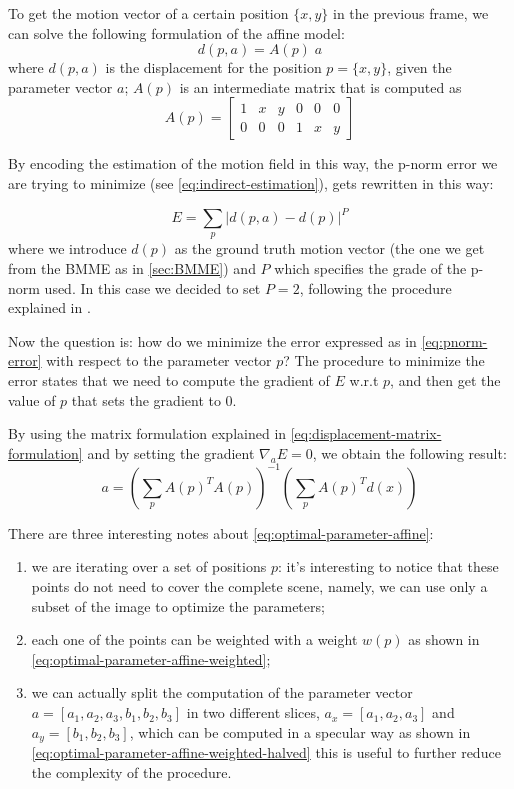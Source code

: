 To get the motion vector of a certain position $\{x,y\}$ in the previous frame, we can solve the following formulation of the affine model:
\begin{equation}
    \label{eq:displacement-matrix-formulation}
    d(p, a) = A(p)\;a
\end{equation}
where $d(p, a)$ is the displacement for the position $p = \{x,y\}$, given the parameter vector $a$; $A(p)$ is an intermediate matrix that is computed as 
\begin{equation*}
    A(p) = \begin{bmatrix}
        1 & x & y & 0 & 0 & 0 \\
        0 & 0 & 0 & 1 & x & y
    \end{bmatrix}
\end{equation*}

By encoding the estimation of the motion field in this way, the p-norm error we are trying to minimize (see \cref{eq:indirect-estimation}), gets rewritten in this way:

\begin{equation}
    \label{eq:pnorm-error}
    E = \sum_p{\left| d(p, a) - d(p) \right|^P}
\end{equation}
where we introduce $d(p)$ as the ground truth motion vector (the one we get from the BMME as in \cref{sec:BMME}) and $P$ which specifies the grade of the p-norm used. In this case we decided to set $P=2$, following the procedure explained in \cite{WangBook}.

Now the question is: how do we minimize the error expressed as in \cref{eq:pnorm-error} with respect to the parameter vector $p$?
The procedure to minimize the error states that we need to compute the gradient of $E$ w.r.t $p$, and then get the value of $p$ that sets the gradient to 0.

By using the matrix formulation explained in \cref{eq:displacement-matrix-formulation} and by setting the gradient $\nabla_a E = 0$, we obtain the following result:
\begin{equation}
    \label{eq:optimal-parameter-affine}
    a = \left (\sum_p A(p)^T A(p) \right )^{-1} \left (\sum_p A(p)^T d(x) \right)
\end{equation}

There are three interesting notes about \cref{eq:optimal-parameter-affine}:
\begin{enumerate}
    \item we are iterating over a set of positions $p$: it's interesting to notice that these points do not need to cover the complete scene, namely, we can use only a subset of the image to optimize the parameters;
    \item each one of the points can be weighted with a weight $w(p)$ as shown in \cref{eq:optimal-parameter-affine-weighted};
    \item we can actually split the computation of the parameter vector $a = [a_1, a_2, a_3, b_1, b_2, b_3]$ in two different slices, $a_x = [a_1, a_2, a_3]$ and $a_y = [b_1, b_2, b_3]$, which can be computed in a specular way as shown in \cref{eq:optimal-parameter-affine-weighted-halved} this is useful to further reduce the complexity of the procedure.
\end{enumerate} 

